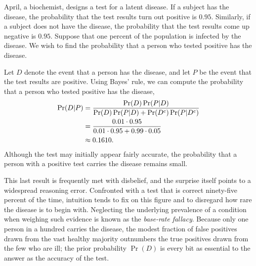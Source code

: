 \begin{example}
April, a biochemist, designs a test for a latent disease.
If a subject has the disease, the probability that the test results turn out positive is $0.95$.
Similarly, if a subject does not have the disease, the probability that the test results come up negative is $0.95$.
Suppose that one percent of the population is infected by the disease.
We wish to find the probability that a person who tested positive has the disease.

Let $D$ denote the event that a person has the disease, and let $P$ be the event that the test results are positive.
Using Bayes' rule, we can compute the probability that a person who tested positive has the disease,
\begin{equation*}
\begin{split}
\Pr (D|P)
&= \frac{ \Pr(D) \Pr(P|D) }{ \Pr(D) \Pr(P|D) + \Pr(D^{\mathrm{c}}) \Pr(P|D^{\mathrm{c}}) } \\
&= \frac{ 0.01 \cdot 0.95 }{ 0.01 \cdot 0.95 + 0.99 \cdot 0.05 } \\
&\approx 0.1610 .
\end{split}
\end{equation*}
Although the test may initially appear fairly accurate, the probability that a person with a positive test carries the disease remains small.
\end{example}

This last result is frequently met with disbelief, and the surprise itself points to a widespread reasoning error.
Confronted with a test that is correct ninety-five percent of the time, intuition tends to fix on this figure and to disregard how rare the disease is to begin with.
Neglecting the underlying prevalence of a condition when weighing such evidence is known as the \emph{base-rate fallacy}.
Because only one person in a hundred carries the disease, the modest fraction of false positives drawn from the vast healthy majority outnumbers the true positives drawn from the few who are ill;
the prior probability $\Pr (D)$ is every bit as essential to the answer as the accuracy of the test.

